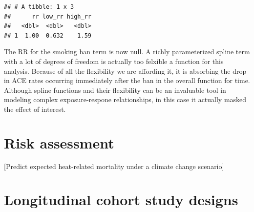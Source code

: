 \documentclass[
]{book}
\newenvironment{Shaded}{\begin{snugshade}}{\end{snugshade}}
\newcommand{\DataTypeTok}[1]{\textcolor[rgb]{0.13,0.29,0.53}{#1}}
\newcommand{\DecValTok}[1]{\textcolor[rgb]{0.00,0.00,0.81}{#1}}
\newcommand{\FloatTok}[1]{\textcolor[rgb]{0.00,0.00,0.81}{#1}}
\newcommand{\KeywordTok}[1]{\textcolor[rgb]{0.13,0.29,0.53}{\textbf{#1}}}
\newcommand{\NormalTok}[1]{#1}
\newcommand{\OperatorTok}[1]{\textcolor[rgb]{0.81,0.36,0.00}{\textbf{#1}}}
\newcommand{\StringTok}[1]{\textcolor[rgb]{0.31,0.60,0.02}{#1}}
\begin{document}
\begin{Shaded}
\end{Shaded}

\begin{verbatim}
## # A tibble: 1 x 3
##      rr low_rr high_rr
##   <dbl>  <dbl>   <dbl>
## 1  1.00  0.632    1.59
\end{verbatim}

The RR for the smoking ban term is now null. A richly parameterized spline term with a lot of degrees of freedom is actually too felxible a function for this analysis. Because of all the flexibility we are affording it, it is absorbing the drop in ACE rates occurring immediately after the ban in the overall function for time. Although spline functions and their flexibility can be an invaluable tool in modeling complex exposure-respone relationships, in this case it actually masked the effect of interest.

\hypertarget{risk-assessment}{%
\chapter{Risk assessment}\label{risk-assessment}}

{[}Predict expected heat-related mortality under a climate change scenario{]}

\hypertarget{longitudinal-cohort-study-designs}{%
\chapter{Longitudinal cohort study designs}\label{longitudinal-cohort-study-designs}}
\end{document}
